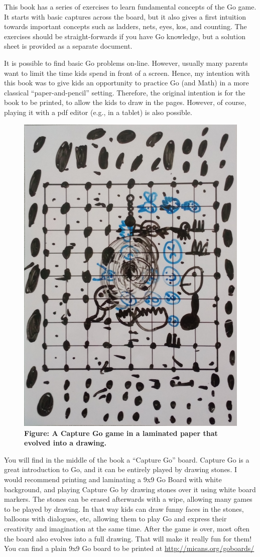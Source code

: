 \documentclass[a4paper,12pt]{extarticle}
\begin{document}
This book has a series of exercises to learn fundamental concepts of the Go game. It starts with basic captures across the board, but it also gives a first intuition towards important concepts such as ladders, nets, eyes, kos, and counting. The exercises should be straight-forwards if you have Go knowledge, but a solution sheet is provided as a separate document.

It is possible to find basic Go problems on-line. However, usually many parents want to limit the time kids spend in front of a screen. Hence, my intention with this book was to give kids an opportunity to practice Go (and Math) in a more classical ``paper-and-pencil'' setting. Therefore, the original intention is for the book to be printed, to allow the kids to draw in the pages. However, of course, playing it with a pdf editor (e.g., in a tablet) is also possible.

\begin{figure}
  \includegraphics[width=0.35\columnwidth]{imgs/captureGo.jpg}\\
  \textbf{Figure: A Capture Go game in a laminated paper that evolved into a drawing.}
\end{figure}

You will find in the middle of the book a ``Capture Go'' board. Capture Go is a great introduction to Go, and it can be entirely played by drawing stones. I would recommend printing and laminating a 9x9 Go Board with white background, and playing Capture Go by drawing stones over it using white board markers. The stones can be erased afterwards with a wipe, allowing many games to be played by drawing. In that way kids can draw funny faces in the stones, balloons with dialogues, etc, allowing them to play Go and express their creativity and imagination at the same time. After the game is over, most often the board also evolves into a full drawing. That will make it really fun for them! You can find a plain 9x9 Go board to be printed at \url{http://micans.org/goboards/}
\end{document}
